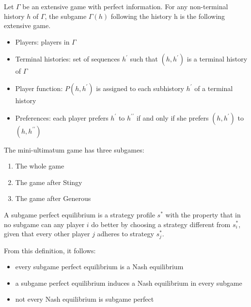 \begin{definition}[Subgame]
      Let $\Gamma$ be an extensive game with perfect information. For any non-terminal
      history $h$ of $\Gamma$, the subgame $\Gamma(h)$ following the history h is the following extensive
      game.
      \begin{itemize}
            \item Players: players in $\Gamma$
            \item Terminal histories: set of sequences $h^{\prime}$ such that $(h, h^{\prime})$ is a terminal history of $\Gamma$
            \item Player function: $P(h,h^{\prime})$ is assigned to each subhistory $h^{\prime}$ of a terminal history
            \item Preferences: each player prefers $h^{\prime}$ to $h^{\prime \prime}$ if and only if she prefers $(h,h^{\prime})$ to $(h,h^{\prime \prime})$
      \end{itemize}
\end{definition}


\begin{example}
      The mini-ultimatum game has three subgames:
      \begin{enumerate}
            \item The whole game
            \item The game after Stingy
            \item The game after Generous
      \end{enumerate}
\end{example}


\begin{definition}
      A subgame perfect equilibrium is a strategy profile $s^*$ with the property that in no
      subgame can any player $i$ do better by choosing a strategy different from $s_i^*$, given that
      every other player $j$ adheres to strategy $s_j^*$.
\end{definition}


\begin{corollary}
      From this definition, it follows:
      \begin{itemize}
            \item every subgame perfect equilibrium is a Nash equilibrium
            \item a subgame perfect equilibrium induces a Nash equilibrium in every subgame
            \item not every Nash equilibrium is subgame perfect
      \end{itemize}
\end{corollary}


